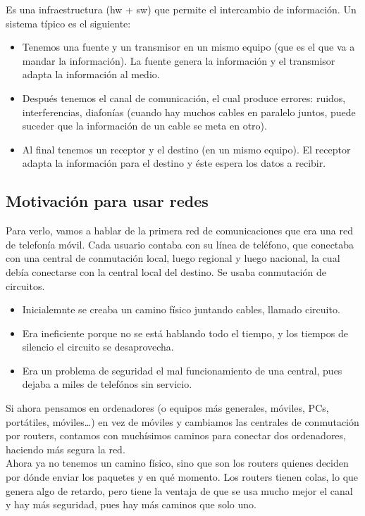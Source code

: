\begin{definicion}
    Es una infraestructura (hw + sw) que permite el intercambio de información. Un sistema típico es el siguiente:
    \begin{itemize}
        \item Tenemos una fuente y un transmisor en un mismo equipo (que es el que va a mandar la información). La fuente genera la información y el transmisor adapta la información al medio.
        \item Después tenemos el canal de comunicación, el cual produce errores: ruidos, interferencias, diafonías (cuando hay muchos cables en paralelo juntos, puede suceder que la información de un cable se meta en otro). 
        \item Al final tenemos un receptor y el destino (en un mismo equipo). El receptor adapta la información para el destino y éste espera los datos a recibir. 
    \end{itemize}
\end{definicion}


\subsection{Motivación para usar redes}
Para verlo, vamos a hablar de la primera red de comunicaciones que era una red de telefonía móvil. 
Cada usuario contaba con su línea de teléfono, que conectaba con una central de conmutación local, luego regional y luego nacional, la cual debía conectarse con la central local del destino. Se usaba conmutación de circuitos. 
\begin{itemize}
    \item Inicialemnte se creaba un camino físico juntando cables, llamado circuito. 
    \item Era ineficiente porque no se está hablando todo el tiempo, y los tiempos de silencio el circuito se desaprovecha. 
    \item Era un problema de seguridad el mal funcionamiento de una central, pues dejaba a miles de telefónos sin servicio. 
\end{itemize}

Si ahora pensamos en ordenadores (o equipos más generales, móviles, PCs, portátiles, móviles\ldots) en vez de móviles y cambiamos las centrales de conmutación por routers, contamos con muchísimos caminos para conectar dos ordenadores, haciendo más segura la red.\\

Ahora ya no tenemos un camino físico, sino que son los routers quienes deciden por dónde enviar los paquetes y en qué momento. Los routers tienen colas, lo que genera algo de retardo, pero tiene la ventaja de que se usa mucho mejor el canal y hay más seguridad, pues hay más caminos que solo uno.\\ 

